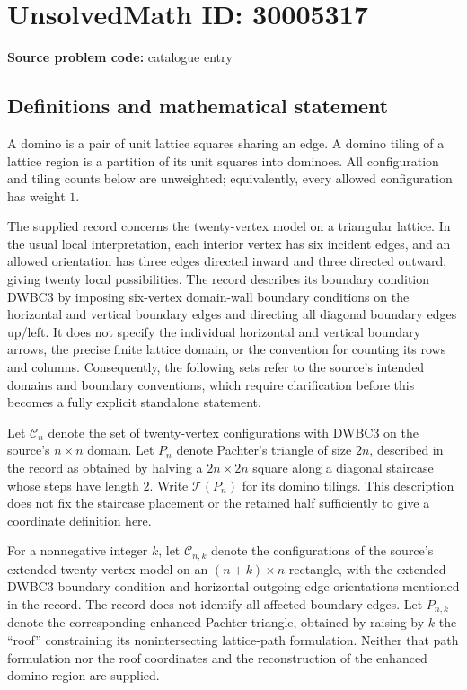 \documentclass[11pt]{article}
\begin{document}
\section*{UnsolvedMath ID: 30005317}
\textbf{Source problem code:} catalogue entry
\subsection{Definitions and mathematical statement}
A domino is a pair of unit lattice squares sharing an edge. A domino tiling of a lattice region is a partition of its unit squares into dominoes. All configuration and tiling counts below are unweighted; equivalently, every allowed configuration has weight \(1\).

The supplied record concerns the twenty-vertex model on a triangular lattice. In the usual local interpretation, each interior vertex has six incident edges, and an allowed orientation has three edges directed inward and three directed outward, giving twenty local possibilities. The record describes its boundary condition DWBC3 by imposing six-vertex domain-wall boundary conditions on the horizontal and vertical boundary edges and directing all diagonal boundary edges up/left. It does not specify the individual horizontal and vertical boundary arrows, the precise finite lattice domain, or the convention for counting its rows and columns. Consequently, the following sets refer to the source's intended domains and boundary conventions, which require clarification before this becomes a fully explicit standalone statement.

Let \(\mathcal C_n\) denote the set of twenty-vertex configurations with DWBC3 on the source's \(n\times n\) domain. Let \(P_n\) denote Pachter's triangle of size \(2n\), described in the record as obtained by halving a \(2n\times 2n\) square along a diagonal staircase whose steps have length \(2\). Write \(\mathcal T(P_n)\) for its domino tilings. This description does not fix the staircase placement or the retained half sufficiently to give a coordinate definition here.

For a nonnegative integer \(k\), let \(\mathcal C_{n,k}\) denote the configurations of the source's extended twenty-vertex model on an \((n+k)\times n\) rectangle, with the extended DWBC3 boundary condition and horizontal outgoing edge orientations mentioned in the record. The record does not identify all affected boundary edges. Let \(P_{n,k}\) denote the corresponding enhanced Pachter triangle, obtained by raising by \(k\) the ``roof'' constraining its nonintersecting lattice-path formulation. Neither that path formulation nor the roof coordinates and the reconstruction of the enhanced domino region are supplied.
\end{document}

